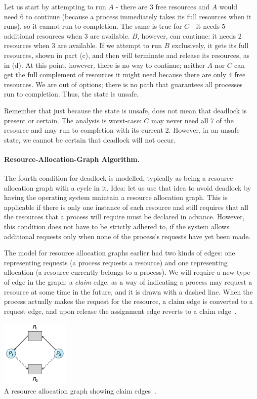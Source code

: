 Let us start by attempting to run $A$ - there are 3 free resources and $A$ would need 6 to continue (because a process immediately takes its full resources when it runs), so it cannot run to completion. The same is true for $C$ - it needs 5 additional resources when 3 are available. $B$, however, can continue: it needs 2 resources when 3 are available. If we attempt to run $B$ exclusively, it gets its full resources, shown in part (c), and then will terminate and release its resources, as in (d). At this point, however, there is no way to continue; neither $A$ nor $C$ can get the full complement of resources it might need because there are only 4 free resources. We are out of options; there is no path that guarantees all processes run to completion. Thus, the state is unsafe. 

Remember that just because the state is unsafe, does not mean that deadlock is present or certain. The analysis is worst-case: $C$ may never need all 7 of the resource and may run to completion with its current 2. However, in an unsafe state, we cannot be certain that deadlock will not occur.

\paragraph{Resource-Allocation-Graph Algorithm.} The fourth condition for deadlock is modelled, typically as being a resource allocation graph with a cycle in it. Idea: let us use that idea to avoid deadlock by having the operating system maintain a resource allocation graph. This is applicable if there is only one instance of each resource and still requires that all the resources that a process will require must be declared in advance. However, this condition does not have to be strictly adhered to, if the system allows additional requests only when none of the process's requests have yet been made.

The model for resource allocation graphs earlier had two kinds of edges: one representing requests (a process requests a resource) and one representing allocation (a resource currently belongs to a process). We will require a new type of edge in the graph: a \textit{claim} edge, as a way of indicating a process may request a resource at some time in the future, and it is drawn with a dashed line. When the process actually makes the request for the resource, a claim edge is converted to a request edge, and upon release the assignment edge reverts to a claim edge~\cite{osc}.

\begin{center}
\includegraphics[width=0.25\textwidth]{images/resource-allocation-graph-claim.png}\\
A resource allocation graph showing claim edges~\cite{osc}.
\end{center}

